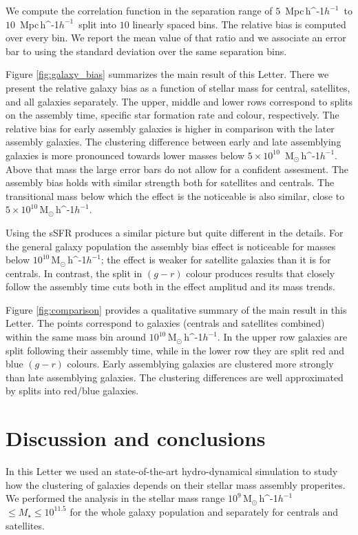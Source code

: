 \documentclass[fleqn,usenatbib]{mnras}
\newcommand{\Msunh}{\,{\rm M}$_{\odot}$\,\ifmmode h^{-1}\else $h^{-1}$\fi}
\newcommand{\Mpch}{\,{\rm Mpc}\,\ifmmode h^{-1}\else $h^{-1}$\fi}
\begin{document}
We compute the correlation function in the separation range of
$5$ \Mpch\ to $10$ \Mpch\ split into $10$ linearly spaced bins. 
The relative bias is computed over every bin.
We report the mean value of that ratio and we associate an error bar
to using the standard deviation over the same separation bins.

Figure \ref{fig:galaxy_bias} summarizes the main result of this Letter.
There we present the relative galaxy bias as a
function of stellar mass for central, satellites, and all galaxies
separately. 
The upper, middle and lower rows correspond to splits on the assembly
time, specific star formation rate and colour, respectively.
The relative bias for early assembly galaxies is higher in comparison
with the later assembly galaxies.
The clustering difference between early and late assemblying galaxies
is more pronounced towards lower masses below $5 \times 10^{10}$
\Msunh.
Above that mass the large error bars do not allow for a confident
assesment. 
The assembly bias holds with similar strength both for satellites and
centrals. 
The transitional mass below which the effect is the noticeable is also
similar, close to $5\times 10^{10}$\Msunh.

Using the sSFR produces a similar picture but quite different in the
details. 
For the general galaxy population the assembly bias effect is
noticeable for masses below $10^{10}$\Msunh; the effect is weaker for
satellite galaxies than it is for centrals. 
In contrast, the split in $(g-r)$ colour produces results that
closely follow the assembly time cuts both in the effect amplitud and
its mass trends.

Figure \ref{fig:comparison} provides a qualitative summary of the main
result in this Letter.
The points correspond to galaxies (centrals and satellites combined) 
within the same mass bin around $10^{10}$\Msunh. 
In the upper row galaxies are split following their assembly time,
while in the lower row they are split red and blue $(g-r)$ colours.
Early assemblying galaxies are clustered more strongly than late
assemblying galaxies. 
The clustering differences are well approximated by splits into
red/blue galaxies. 



\section{Discussion and conclusions}
\label{sec:conclu}

In this Letter we used an state-of-the-art hydro-dynamical simulation
to study how the clustering of galaxies depends on their stellar mass assembly
properites.
We performed the analysis in the stellar mass range $10^{9}$\Msunh
$\leq M_{\star} \leq 10^{11.5}$ for the whole galaxy population and
separately for centrals and satellites. 
\end{document}
